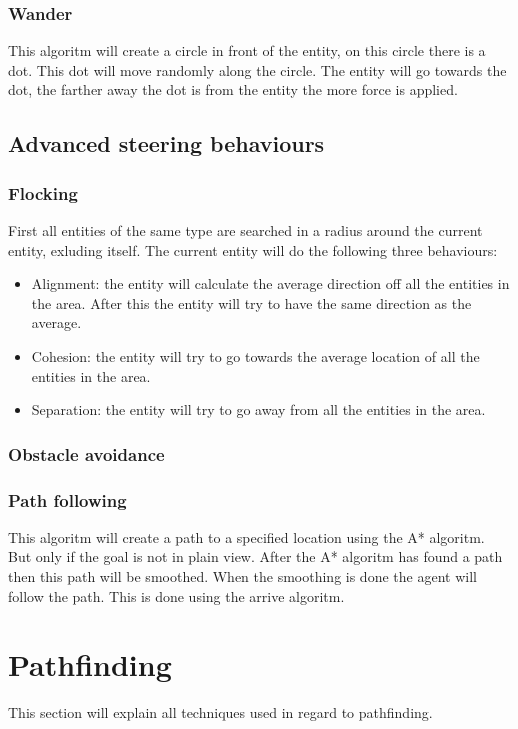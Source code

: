 \documentclass{article}
\begin{document}
   \subsubsection {Wander}
  This algoritm will create a circle in front of the entity, on this circle there is a dot. This dot will move randomly along the circle. The entity will go towards the dot, the farther away the dot is from the entity the more force is applied. 
  \subsection{Advanced steering behaviours}
  \subsubsection {Flocking}
  First all entities of the same type are searched in a radius around the current entity, exluding itself. The current entity will do the following three behaviours: 
  \begin{itemize}
  \item Alignment: the entity will calculate the average direction off all the entities in the area. After this the entity will try to have the same direction as the average.
  \item Cohesion: the entity will try to go towards the average location of all the entities in the area.
  \item Separation: the entity  will try to go away from all the entities in the area. 
  \end{itemize}
  \subsubsection {Obstacle avoidance}
  
  \subsubsection {Path following}
   This algoritm will create a path to a specified location using the A* algoritm. But only if the goal is not in plain view. After the A* algoritm has found a path then this path will be smoothed. When the smoothing is done the agent will follow the path. This is done using the arrive algoritm. 
   \newpage
   
   \section {Pathfinding}
This section will explain all techniques used in regard to pathfinding.
\end{document}
